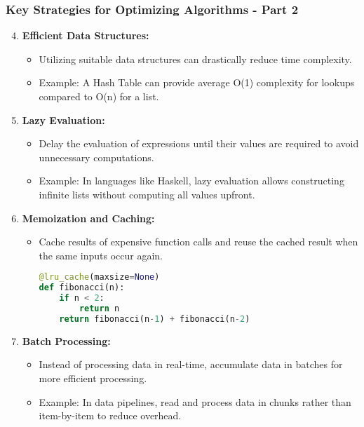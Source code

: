 \documentclass{beamer}
\begin{document}
\begin{frame}[fragile]
    \frametitle{Key Strategies for Optimizing Algorithms - Part 2}
    \begin{enumerate}
        \setcounter{enumi}{3} %

        \item \textbf{Efficient Data Structures:}
        \begin{itemize}
            \item Utilizing suitable data structures can drastically reduce time complexity.
            \item Example: A Hash Table can provide average O(1) complexity for lookups compared to O(n) for a list.
        \end{itemize}

        \item \textbf{Lazy Evaluation:}
        \begin{itemize}
            \item Delay the evaluation of expressions until their values are required to avoid unnecessary computations.
            \item Example: In languages like Haskell, lazy evaluation allows constructing infinite lists without computing all values upfront.
        \end{itemize}

        \item \textbf{Memoization and Caching:}
        \begin{itemize}
            \item Cache results of expensive function calls and reuse the cached result when the same inputs occur again.
            \begin{lstlisting}[language=Python]
@lru_cache(maxsize=None)
def fibonacci(n):
    if n < 2:
        return n
    return fibonacci(n-1) + fibonacci(n-2)
            \end{lstlisting}
        \end{itemize}

        \item \textbf{Batch Processing:}
        \begin{itemize}
            \item Instead of processing data in real-time, accumulate data in batches for more efficient processing.
            \item Example: In data pipelines, read and process data in chunks rather than item-by-item to reduce overhead.
        \end{itemize}
    \end{enumerate}
\end{frame}
\end{document}
